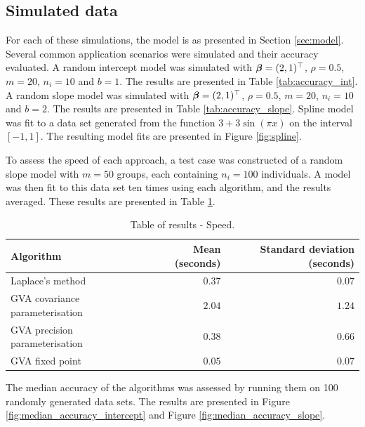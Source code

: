 \newpage 
		
\subsection{Simulated data}
For each of these simulations, the model is as presented in Section
\ref{sec:model}. Several common application scenarios were simulated and their
accuracy evaluated. A random intercept model was simulated with ${\boldsymbol \beta} = (2,
1)^\top$, $\rho = 0.5$, $m = 20$, $n_i = 10$ and $b = 1$. The results are
presented in Table \ref{tab:accuracy_int}. A random slope model was simulated
with ${\boldsymbol \beta} = (2, 1)^\top$, $\rho = 0.5$, $m = 20$, $n_i = 10$ and $b = 2$.
The results are presented in Table \ref{tab:accuracy_slope}. Spline model was
fit to a data set generated from the function $3 + 3 \sin{(\pi x)}$ on the
interval $[-1, 1]$. The resulting model fits are presented in Figure
\ref{fig:spline}.
		
To assess the speed of each approach, a test case was constructed of a random
slope model with $m=50$ groups, each containing $n_i = 100$ individuals. A
model was then fit to this data set ten times using each algorithm, and the
results averaged. These results are presented in Table
\ref{tab:application_slope_speed}.

\begin{table}
{\footnotesize 
	\begin{tabular}{|l|rr|}
		\hline
		Algorithm & Mean (seconds) & Standard deviation (seconds) \\
		\hline
		Laplace's method & $0.37$ & $0.07$ \\
		GVA covariance parameterisation & $2.04$ & $1.24$ \\
		GVA precision parameterisation & $0.38$ & $0.66$ \\
		GVA fixed point & $0.05$ & $0.07$ \\
		\hline
	\end{tabular}
}\bigskip
	\caption{Table of results - Speed.}
	\label{tab:application_slope_speed}
\end{table}

		
The median accuracy of the algorithms was assessed by running them on 100
randomly generated data sets. The	results are presented in Figure
\ref{fig:median_accuracy_intercept} and Figure \ref{fig:median_accuracy_slope}.
		
